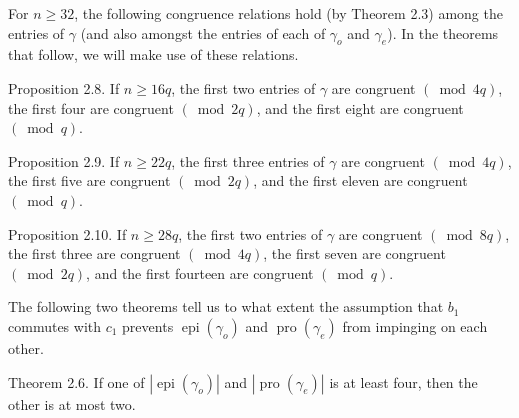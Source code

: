 \documentclass[10pt]{article}
\begin{document}
For $n \geq 32$, the following congruence relations hold (by Theorem 2.3) among the entries of $\gamma$ (and also amongst the entries of each of $\gamma_{o}$ and $\gamma_{e}$). In the theorems that follow, we will make use of these relations.

Proposition 2.8. If $n \geq 16 q$, the first two entries of $\gamma$ are congruent $(\bmod 4 q)$, the first four are congruent $(\bmod 2 q)$, and the first eight are congruent $(\bmod q)$.

Proposition 2.9. If $n \geq 22 q$, the first three entries of $\gamma$ are congruent $(\bmod 4 q)$, the first five are congruent $(\bmod 2 q)$, and the first eleven are congruent $(\bmod q)$.

Proposition 2.10. If $n \geq 28 q$, the first two entries of $\gamma$ are congruent $(\bmod 8 q)$, the first three are congruent $(\bmod 4 q)$, the first seven are congruent $(\bmod 2 q)$, and the first fourteen are congruent $(\bmod q)$.

The following two theorems tell us to what extent the assumption that $b_{1}$ commutes with $c_{1}$ prevents $\operatorname{epi}\left(\gamma_{o}\right)$ and $\operatorname{pro}\left(\gamma_{e}\right)$ from impinging on each other.

Theorem 2.6. If one of $\left|\operatorname{epi}\left(\gamma_{o}\right)\right|$ and $\left|\operatorname{pro}\left(\gamma_{e}\right)\right|$ is at least four, then the other is at most two.
\end{document}
